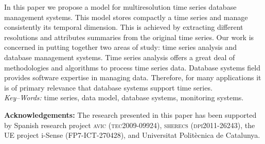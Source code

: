 \documentclass[twocolumn,11pt,a4paper]{article}
\begin{document}
{\begin{minipage}[b]{6.9in}
    In this paper we propose a model for multiresolution time series
    database management systems. This model stores compactly a time series
    and manage consistently its temporal dimension. This is achieved by
    extracting different resolutions and attributes summaries from the
    original time series.
    Our work is concerned in putting together two areas of study: time
    series analysis and database management systems. Time series analysis
    offers a great deal of methodologies and algorithms to process time
    series data. Database systems field provides software expertise in
    managing data. Therefore, for many applications it is of primary
    relevance that database systems support time series.
    \\[4mm] \textit{Key--Words:}
    time series, data model, database systems, monitoring systems.
  \end{minipage}
  \vspace{-10pt}
}

\maketitle

\thispagestyle{empty} \pagestyle{empty}
%
%









\vspace{5pt plus 5pt} 
\noindent \textbf{Acknowledgements:} The research presented in this
paper has been supported by Spanish research project \textsc{avic
  (tec2009-09924)}, \textsc{sherecs (dpi2011-26243)}, the UE project
i-Sense ({\small FP7-ICT-270428}), and Universitat Polit\`{e}cnica de
Catalunya.

\printbibliography{}
\end{document}
